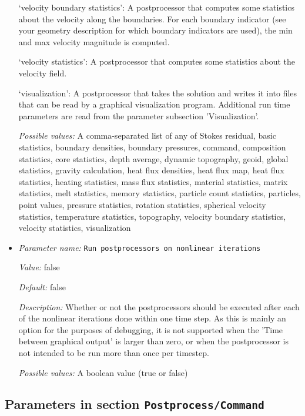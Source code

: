 \begin{itemize}
`velocity boundary statistics': A postprocessor that computes some statistics about the velocity along the boundaries. For each boundary indicator (see your geometry description for which boundary indicators are used), the min and max velocity magnitude is computed.

`velocity statistics': A postprocessor that computes some statistics about the velocity field.

`visualization': A postprocessor that takes the solution and writes it into files that can be read by a graphical visualization program. Additional run time parameters are read from the parameter subsection 'Visualization'.


{\it Possible values:} A comma-separated list of any of Stokes residual, basic statistics, boundary densities, boundary pressures, command, composition statistics, core statistics, depth average, dynamic topography, geoid, global statistics, gravity calculation, heat flux densities, heat flux map, heat flux statistics, heating statistics, mass flux statistics, material statistics, matrix statistics, melt statistics, memory statistics, particle count statistics, particles, point values, pressure statistics, rotation statistics, spherical velocity statistics, temperature statistics, topography, velocity boundary statistics, velocity statistics, visualization
\item {\it Parameter name:} {\tt Run postprocessors on nonlinear iterations}
\label{parameters:Postprocess/Run postprocessors on nonlinear iterations}


{\it Value:} false


{\it Default:} false


{\it Description:} Whether or not the postprocessors should be executed after each of the nonlinear iterations done within one time step. As this is mainly an option for the purposes of debugging, it is not supported when the 'Time between graphical output' is larger than zero, or when the postprocessor is not intended to be run more than once per timestep.


{\it Possible values:} A boolean value (true or false)
\end{itemize}



\subsection{Parameters in section \tt Postprocess/Command}
\label{parameters:Postprocess/Command}

